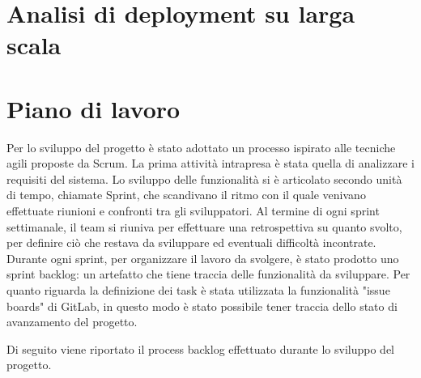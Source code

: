\documentclass[12pt]{article}
\begin{document}

\section{Analisi di deployment su larga scala}



\newpage



\section{Piano di lavoro}

Per lo sviluppo del progetto è stato adottato un processo ispirato alle tecniche agili proposte da Scrum.
La prima attività intrapresa è stata quella di analizzare i requisiti del sistema. Lo sviluppo delle funzionalità si è articolato secondo unità di tempo, chiamate Sprint, che scandivano il ritmo con il quale venivano effettuate riunioni e confronti tra gli sviluppatori. Al termine di ogni sprint settimanale, il team si riuniva per effettuare una retrospettiva su quanto svolto, per definire ciò che restava da sviluppare ed eventuali difficoltà incontrate. Durante ogni sprint, per organizzare il lavoro da svolgere, è stato prodotto uno sprint backlog: un artefatto che tiene traccia delle funzionalità da sviluppare. Per quanto riguarda la definizione dei task è stata utilizzata la funzionalità "issue boards" di GitLab, in questo modo è stato possibile tener traccia dello stato di avanzamento del progetto.

Di seguito viene riportato il process backlog effettuato durante lo sviluppo del progetto.
\end{document}
